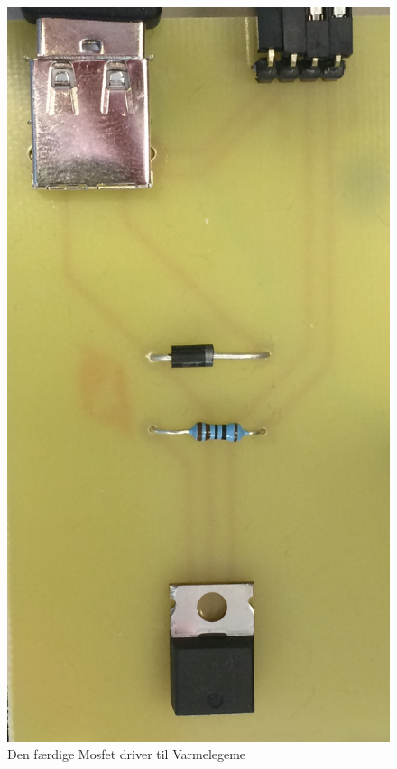 \begin{figure}[h]
\centering 
\includegraphics[width={\textwidth-5cm}, trim=0 0 0 0, clip=true] {../fig/VarmePrintBillede} 
\caption{Den færdige Mosfet driver til Varmelegeme}
\label{fig:varmelegeme_print}
\end{figure}

